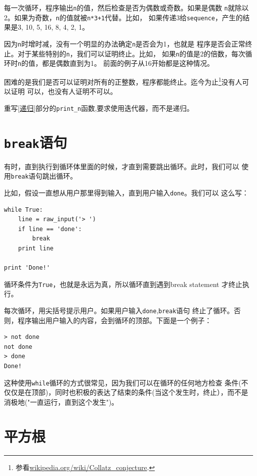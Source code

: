 每一次循环，程序输出{\tt n}的值，然后检查是否为偶数或奇数。如果是偶数
{\tt n}就除以2。如果为奇数，{\tt n}的值就被{\tt n*3+1}代替。比如，
如果传递3给{\tt sequence}，产生的结果是3, 10, 5, 16, 8, 4, 2, 1。

因为{\tt n}时增时减，没有一个明显的办法确定{\tt n}是否会为1，也就是
程序是否会正常终止。对于某些特别的{\tt n}，我们可以证明终止。比如，
如果{\tt n}的值是2的倍数，每次循环时{\tt n}的值，都是偶数直到为1。
前面的例子从16开始都是这种情况。


困难的是我们是否可以证明对所有的正整数，程序都能终止。迄今为止\footnote{参看\url{wikipedia.org/wiki/Collatz_conjecture}.}没有人可以证明
可以，也没有人证明不可以。

\begin{ex}
重写\ref{递归}部分的\verb"print_n"函数,要求使用迭代器，而不是递归。
\end{ex}

\section{{\tt break}语句}

有时，直到执行到循环体里面的时候，才直到需要跳出循环。此时，我们可以
使用{\tt break}语句跳出循环。

比如，假设一直想从用户那里得到输入，直到用户输入{\tt done}。我们可以
这么写：

\beforeverb
\begin{verbatim}
while True:
    line = raw_input('> ')
    if line == 'done':
        break
    print line

print 'Done!'
\end{verbatim}
\afterverb

循环条件为{\tt True}，也就是永远为真，所以循环直到遇到break statement
才终止执行。

每次循环，用尖括号提示用户。如果用户输入{\tt done},{\tt break}语句
终止了循环。否则，程序输出用户输入的内容，会到循环的顶部。下面是一个例子：

\beforeverb
\begin{verbatim}
> not done
not done
> done
Done!
\end{verbatim}
\afterverb
%

这种使用{\tt while}循环的方式很常见，因为我们可以在循环的任何地方检查
条件(不仅仅是在顶部)，同时也积极的表达了结束的条件(当这个发生时，终止），而不是消极地("一直运行，直到这个发生")。

\section{平方根}


